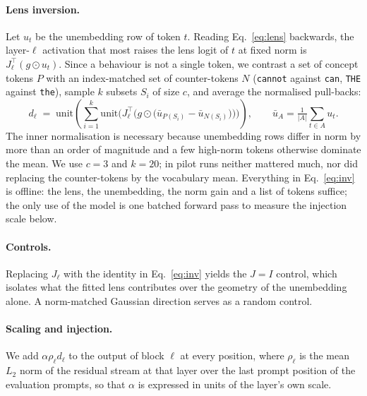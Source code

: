 \documentclass{article}
\begin{document}
\paragraph{Lens inversion.}
Let $u_t$ be the unembedding row of token $t$. Reading Eq.~\ref{eq:lens} backwards, the layer-$\ell$ activation that most raises the lens logit of $t$ at fixed norm is $J_\ell^\top (g \odot u_t)$. Since a behaviour is not a single token, we contrast a set of concept tokens $P$ with an index-matched set of counter-tokens $N$ (\texttt{cannot} against \texttt{can}, \texttt{THE} against \texttt{the}), sample $k$ subsets $S_i$ of size $c$, and average the normalised pull-backs:
\begin{equation}
  d_\ell \;=\; \mathrm{unit}\!\left(\sum_{i=1}^{k} \mathrm{unit}\Big(J_\ell^\top \Big(g \odot \big(\bar u_{P(S_i)} - \bar u_{N(S_i)}\big)\Big)\Big)\right),
  \qquad
  \bar u_A = \tfrac{1}{|A|}\!\sum_{t \in A}\!u_t .
  \label{eq:inv}
\end{equation}
The inner normalisation is necessary because unembedding rows differ in norm by more than an order of magnitude and a few high-norm tokens otherwise dominate the mean. We use $c = 3$ and $k = 20$; in pilot runs neither mattered much, nor did replacing the counter-tokens by the vocabulary mean. Everything in Eq.~\ref{eq:inv} is offline: the lens, the unembedding, the norm gain and a list of tokens suffice; the only use of the model is one batched forward pass to measure the injection scale below.

\paragraph{Controls.}
Replacing $J_\ell$ with the identity in Eq.~\ref{eq:inv} yields the $J{=}I$ control, which isolates what the fitted lens contributes over the geometry of the unembedding alone. A norm-matched Gaussian direction serves as a random control.

\paragraph{Scaling and injection.}
We add $\alpha \rho_\ell d_\ell$ to the output of block $\ell$ at every position, where $\rho_\ell$ is the mean $L_2$ norm of the residual stream at that layer over the last prompt position of the evaluation prompts, so that $\alpha$ is expressed in units of the layer's own scale.
\end{document}
